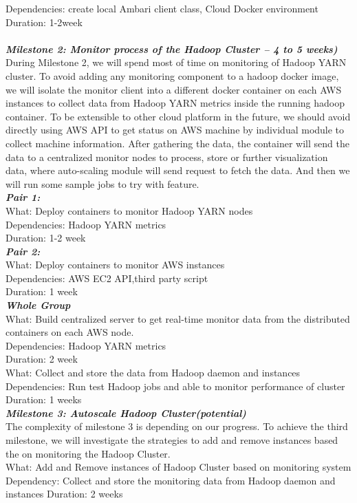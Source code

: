 \documentclass{article}
\begin{document}
Dependencies: create local Ambari client class, Cloud Docker environment\\
Duration: 1-2week\\
\\
\emph{\textbf{Milestone 2: Monitor process of the Hadoop Cluster -- 4 to 5 weeks)}}\\
During Milestone 2, we will spend most of time on monitoring of Hadoop YARN cluster. To avoid adding any monitoring component to a hadoop docker image, we will isolate the monitor client into a different docker container on each AWS instances to collect data from Hadoop YARN metrics inside the running hadoop container. To be extensible to other cloud platform in the future, we should avoid directly using AWS API to get status on AWS machine by individual module to collect machine information. After gathering the data, the container will send the data to a centralized monitor nodes to process, store or further visualization data, where auto-scaling module will send request to fetch the data.  And then we will run some sample jobs to try with feature.\\
\emph{\textbf{Pair 1:}}\\
What: Deploy containers to monitor Hadoop YARN nodes\\
Dependencies: Hadoop YARN metrics\\
Duration: 1-2 week\\
\emph{\textbf{Pair 2:}}\\
What: Deploy containers to monitor AWS instances\\
Dependencies: AWS EC2 API,third party script\\
Duration: 1 week\\
\emph{\textbf{Whole Group}}\\
What: Build centralized server to get real-time monitor data from the distributed containers on each AWS node.\\
Dependencies: Hadoop YARN metrics\\
Duration: 2 week\\
What: Collect and store the data from Hadoop daemon and instances\\
Dependencies: Run test Hadoop jobs and able to monitor performance of cluster\\
Duration: 1 weeks\\
\emph{\textbf{Milestone 3: Autoscale Hadoop Cluster(potential)}}\\
The complexity of milestone 3 is depending on our progress.  To achieve the third milestone, we will investigate the strategies to add and remove instances based the on monitoring the Hadoop Cluster.\\
What: Add and Remove instances of Hadoop Cluster based on monitoring system  Dependency:  Collect and store the monitoring data from Hadoop daemon and instances  Duration: 2 weeks
\end{document}
